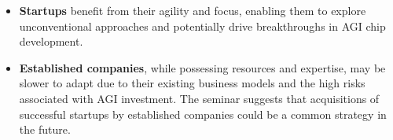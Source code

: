 \documentclass[
]{article}
\begin{document}
\begin{itemize}
\begin{itemize}
    \begin{itemize}
    
    \item
      \textbf{Startups} benefit from their agility and focus, enabling
      them to explore unconventional approaches and potentially drive
      breakthroughs in AGI chip development.
    \item
      \textbf{Established companies}, while possessing resources and
      expertise, may be slower to adapt due to their existing business
      models and the high risks associated with AGI investment. The
      seminar suggests that acquisitions of successful startups by
      established companies could be a common strategy in the future.
    \end{itemize}
  \end{itemize}
\end{itemize}
\end{document}
